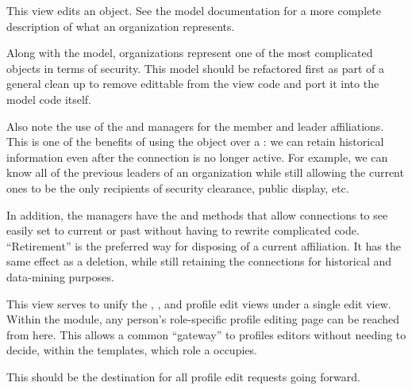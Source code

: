 \documentclass[letterpaper,10pt,english]{sphinxmanual}
\begin{document}
\begin{fulllineitems}
\label{generated/apps.profiles.views:apps.profiles.views.edit_organization}
This view edits an  object.  See the model documentation
for a more complete description of what an organization represents.

Along with the  model, organizations represent one of the most
complicated objects in terms of security.  This model should be refactored first
as part of a general clean up to remove edittable from the view code and port
it into the model code itself.

Also note the use of the  and  managers for the member
and leader affiliations.  This is one of the benefits of using the 
 object over a : we can retain historical
information even after the connection is no longer active.  For example, 
we can know all of the previous leaders of an organization while still allowing 
the current ones to be the only recipients of security clearance, public display,
etc.

In addition, the  managers have the  and  methods
that allow connections to see easily set to current or past without having to 
rewrite complicated code.  ``Retirement'' is the preferred way for disposing of a current
affiliation.  It has the same effect as a deletion, while still retaining the 
connections for historical and data-mining purposes.

\end{fulllineitems}



\begin{fulllineitems}
\label{generated/apps.profiles.views:apps.profiles.views.edit_person_profile}
This view serves to unify the , , and 
profile edit views under a single edit view.  Within the  module, 
any person's role-specific profile editing page can be reached from here.  
This allows a common ``gateway'' to profiles editors without needing to decide, 
within the templates, which role a  occupies.

This should be the destination for all profile edit requests going forward.

\end{fulllineitems}
\end{document}
